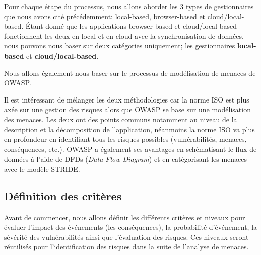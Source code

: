 Pour chaque étape du processus, nous allons aborder les 3 types de gestionnaires que nous avons cité précédemment: local-based, browser-based et cloud/local-based. Étant donné que les applications browser-based et cloud/local-based fonctionnent les deux en local et en cloud avec la synchronisation de données, nous pouvons nous baser sur deux catégories uniquement; les gestionnaires \textbf{local-based} et \textbf{cloud/local-based}. 

Nous allons également nous baser sur le processus de modélisation de menaces de OWASP\cite{owasp}.

Il est intéressant de mélanger les deux méthodologies car la norme ISO est plus axée sur une gestion des risques alors que OWASP se base sur une modélisation des menaces. Les deux ont des points communs notamment au niveau de la description et la décomposition de l'application, néanmoins la norme ISO va plus en profondeur en identifiant tous les risques possibles (vulnérabilités, menaces, conséquences, etc.). OWASP a également ses avantages en schématisant le flux de données à l'aide de DFDs (\textit{Data Flow Diagram}) et en catégorisant les menaces avec le modèle STRIDE. \newpage

\subsection{Définition des critères}

Avant de commencer, nous allons définir les différents critères et niveaux pour évaluer l'impact des événements (les conséquences), la probabilité d'événement, la sévérité des vulnérabilités ainsi que l'évaluation des risques. Ces niveaux seront réutilisés pour l'identification des risques dans la suite de l'analyse de menaces.

